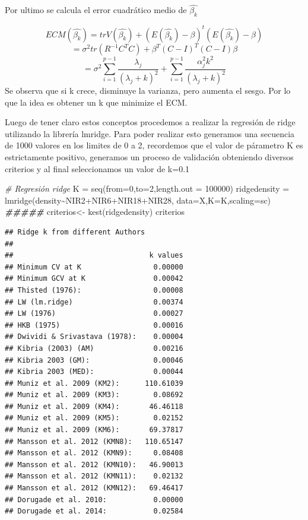 \documentclass[
]{article}
\newenvironment{Shaded}{\begin{snugshade}}{\end{snugshade}}
\newcommand{\AttributeTok}[1]{\textcolor[rgb]{0.77,0.63,0.00}{#1}}
\newcommand{\CommentTok}[1]{\textcolor[rgb]{0.56,0.35,0.01}{\textit{#1}}}
\newcommand{\DecValTok}[1]{\textcolor[rgb]{0.00,0.00,0.81}{#1}}
\newcommand{\DocumentationTok}[1]{\textcolor[rgb]{0.56,0.35,0.01}{\textbf{\textit{#1}}}}
\newcommand{\FunctionTok}[1]{\textcolor[rgb]{0.00,0.00,0.00}{#1}}
\newcommand{\NormalTok}[1]{#1}
\newcommand{\OtherTok}[1]{\textcolor[rgb]{0.56,0.35,0.01}{#1}}
\newcommand{\SpecialCharTok}[1]{\textcolor[rgb]{0.00,0.00,0.00}{#1}}
\newcommand{\StringTok}[1]{\textcolor[rgb]{0.31,0.60,0.02}{#1}}
\begin{document}
Por ultimo se calcula el error cuadrático medio de \(\hat{\beta_k}\)

\[ECM(\hat{\beta_k})=trV(\hat{\beta_k})+(E(\hat{\beta_k})-\beta)^t(E(\hat{\beta_k})-\beta)\]
\[=\sigma^2tr(R^{-1}C^TC)+\beta^T(C-I)^T(C-I)\beta\]
\[=\sigma^2\sum_{i=1}^{p-1}\frac{\lambda_j}{(\lambda_j+k)^2}+\sum_{i=1}^{p-1}\frac{\alpha^2_jk^2}{(\lambda_j+k)^2}\]
Se observa que si k crece, disminuye la varianza, pero aumenta el sesgo.
Por lo que la idea es obtener un k que minimize el ECM.

Luego de tener claro estos conceptos procedemos a realizar la regresión
de ridge utilizando la librería lmridge. Para poder realizar esto
generamos una secuencia de 1000 valores en los limites de 0 a 2,
recordemos que el valor de párametro K es estrictamente positivo,
generamos un proceso de validación obteniendo diversos criterios y al
final seleccionamos un valor de k=0.1

\begin{Shaded}
\begin{Highlighting}[]
\CommentTok{\# Regresión ridge}
\NormalTok{K }\OtherTok{=} \FunctionTok{seq}\NormalTok{(}\AttributeTok{from=}\DecValTok{0}\NormalTok{,}\AttributeTok{to=}\DecValTok{2}\NormalTok{,}\AttributeTok{length.out =} \DecValTok{100000}\NormalTok{)}
\NormalTok{ridgedensity }\OtherTok{=} \FunctionTok{lmridge}\NormalTok{(density}\SpecialCharTok{\textasciitilde{}}\NormalTok{NIR2}\SpecialCharTok{+}\NormalTok{NIR6}\SpecialCharTok{+}\NormalTok{NIR18}\SpecialCharTok{+}\NormalTok{NIR28,}
                       \AttributeTok{data=}\NormalTok{X,}\AttributeTok{K=}\NormalTok{K,}\AttributeTok{scaling=}\StringTok{\textquotesingle{}sc\textquotesingle{}}\NormalTok{)}
\DocumentationTok{\#\#\#\#\#}
\NormalTok{criterios}\OtherTok{\textless{}{-}} \FunctionTok{kest}\NormalTok{(ridgedensity)}
\NormalTok{criterios}
\end{Highlighting}
\end{Shaded}

\begin{verbatim}
## Ridge k from different Authors
## 
##                                k values
## Minimum CV at K                 0.00000
## Minimum GCV at K                0.00042
## Thisted (1976):                 0.00008
## LW (lm.ridge)                   0.00374
## LW (1976)                       0.00027
## HKB (1975)                      0.00016
## Dwividi & Srivastava (1978):    0.00004
## Kibria (2003) (AM)              0.00216
## Kibria 2003 (GM):               0.00046
## Kibria 2003 (MED):              0.00044
## Muniz et al. 2009 (KM2):      110.61039
## Muniz et al. 2009 (KM3):        0.08692
## Muniz et al. 2009 (KM4):       46.46118
## Muniz et al. 2009 (KM5):        0.02152
## Muniz et al. 2009 (KM6):       69.37817
## Mansson et al. 2012 (KMN8):   110.65147
## Mansson et al. 2012 (KMN9):     0.08408
## Mansson et al. 2012 (KMN10):   46.90013
## Mansson et al. 2012 (KMN11):    0.02132
## Mansson et al. 2012 (KMN12):   69.46417
## Dorugade et al. 2010:           0.00000
## Dorugade et al. 2014:           0.02584
\end{verbatim}
\end{document}
